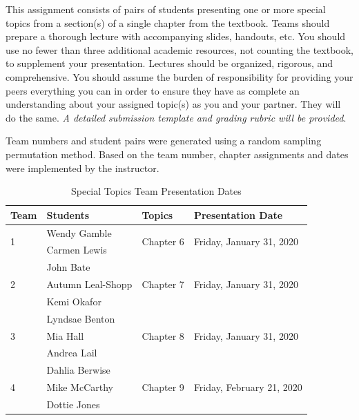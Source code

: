 \documentclass[
]{article}
\begin{document}
This assignment consists of pairs of students presenting one or more
special topics from a section(s) of a single chapter from the textbook.
Teams should prepare a thorough lecture with accompanying slides,
handouts, etc. You should use no fewer than three additional academic
resources, not counting the textbook, to supplement your presentation.
Lectures should be organized, rigorous, and comprehensive. You should
assume the burden of responsibility for providing your peers everything
you can in order to ensure they have as complete an understanding about
your assigned topic(s) as you and your partner. They will do the same.
\emph{A detailed submission template and grading rubric will be
provided}.

Team numbers and student pairs were generated using a random sampling
permutation method. Based on the team number, chapter assignments and
dates were implemented by the instructor.

\begin{table}[H]
\begin{center}
\caption{Special Topics Team Presentation Dates}
\vspace{3mm}
\begin{tabular}{llll}
\hline
\textbf{Team} & \textbf{Students} & \textbf{Topics} & \textbf{Presentation Date} \\
\hline
\multirow{2}{*}{1} & Wendy Gamble & \multirow{2}{*}{Chapter 6} & \multirow{2}{*}{Friday, January 31, 2020} \\
 & Carmen Lewis &  &  \\
\hline
\multirow{3}{*}{2} & John Bate & \multirow{3}{*}{Chapter 7} & \multirow{3}{*}{Friday, January 31, 2020} \\
& Autumn Leal-Shopp &  &  \\
& Kemi Okafor &  &  \\
\hline
\multirow{3}{*}{3} & Lyndsae Benton & \multirow{3}{*}{Chapter 8} & \multirow{3}{*}{Friday, January 31, 2020} \\
& Mia Hall &  & \\
& Andrea Lail &  & \\
\hline
\multirow{3}{*}{4} & Dahlia Berwise & \multirow{3}{*}{Chapter 9} & \multirow{3}{*}{Friday, February 21, 2020} \\
& Mike McCarthy &  &  \\
& Dottie Jones &   & \\
\hline
\end{tabular}
\end{center}
\end{table}
\end{document}
